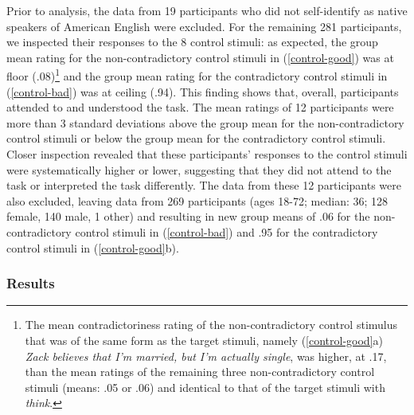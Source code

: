 \documentclass[11pt,fleqn]{article}
\newcommand{\6}{\mbox{$[\hspace*{-.6mm}[$}}
\newcommand{\9}{\mbox{$]\hspace*{-.6mm}]$}}
\begin{document}
{Prior to analysis, the data from 19 participants who did not self-identify as native speakers of American English were excluded. For the remaining 281 participants, we inspected their responses to the 8 control stimuli: as expected, the group mean rating for the non-contradictory control stimuli in (\ref{control-good}) was at floor (.08)\footnote{The mean contradictoriness rating of the non-contradictory control stimulus that was of the same form as the target stimuli, namely (\ref{control-good}a) {\em Zack believes that I'm married, but I'm actually single}, was higher, at .17, than the mean ratings of the remaining three non-contradictory control stimuli (means: .05 or .06) and identical to that of the target stimuli with {\em think}.}  and the group mean rating for the contradictory control stimuli in (\ref{control-bad}) was at ceiling (.94). This finding shows that, overall, participants attended to and understood the task. The mean ratings of 12 participants were more than 3 standard deviations above the group mean for the non-contradictory control stimuli or below the group mean for the contradictory control stimuli. Closer inspection revealed that these participants' responses to the control stimuli were systematically higher or lower, suggesting that they did not attend to the task or interpreted the task differently. The data from these 12 participants were also excluded, leaving data from 269 participants (ages 18-72; median: 36; 128 female, 140 male, 1 other) and resulting in new group means of .06 for the non-contradictory control stimuli in (\ref{control-bad}) and .95 for the contradictory control stimuli in (\ref{control-good}b). 

\subsubsection{Results}

}
\end{document}
